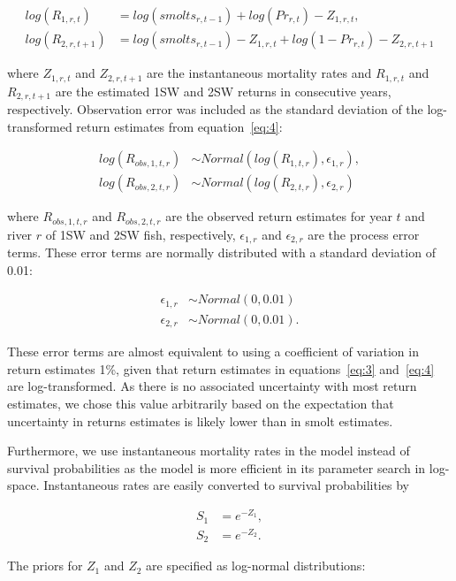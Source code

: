 \documentclass[12pt]{article}
\begin{document}
\begin{align}
    log(R_{1,r,t}) &= log(smolts_{r,t-1}) + log(Pr_{r,t}) - Z_{1,r,t} \label{eq:3}, \\
    log(R_{2,r,t+1}) &= log(smolts_{r,t-1}) - Z_{1,r,t} + log(1 - Pr_{r,t})  - Z_{2,r,t+1} \label{eq:4} 
\end{align}

where $Z_{1,r,t}$ and $Z_{2,r,t+1}$ are the instantaneous mortality rates and
$R_{1,r,t}$ and $R_{2,r,t+1}$ are the estimated 1SW and 2SW returns in
consecutive years, respectively. Observation error was included as the
standard deviation of the log-transformed return estimates from
equation~\ref{eq:4}:

\begin{align}
log(R_{obs,1,t,r}) &\sim Normal(log(R_{1,t,r}), \epsilon_{1,r}), \\
log(R_{obs,2,t,r}) &\sim Normal(log(R_{2,t,r}), \epsilon_{2,r}) \label{eq:5} 
\end{align}

where $R_{obs,1,t,r}$ and $R_{obs,2,t,r}$ are the observed return estimates
for year $t$ and river $r$ of 1SW and 2SW fish, respectively, $\epsilon_{1,r}$
and $\epsilon_{2,r}$ are the process error terms. 
These error terms are normally distributed with a standard deviation
of 0.01:

\begin{align}
\epsilon_{1,r} &\sim Normal(0, 0.01) \\
\epsilon_{2,r} &\sim Normal(0, 0.01).
\end{align}

These error terms are almost equivalent to using a coefficient of variation in
return estimates 1\%, given that return estimates in equations~\ref{eq:3}
and~\ref{eq:4} are log-transformed. As
there is no associated uncertainty with most return estimates, we chose this value arbitrarily
based on the expectation that uncertainty in returns estimates is likely lower than in
smolt estimates.

Furthermore, we use instantaneous mortality rates in the model instead of
survival probabilities as the model is more efficient in its parameter search
in log-space. Instantaneous rates are easily converted to survival
probabilities by 

\begin{align}
 S_{1} &= e^{-Z_1}, \\
 S_{2} &= e^{-Z_2}. 
\end{align}

The priors for $Z_1$ and $Z_2$ are specified as log-normal distributions:
\end{document}
